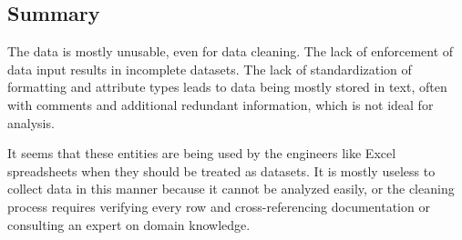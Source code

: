 \subsection{Summary}
The data is mostly unusable, even for data cleaning. The lack of enforcement of data input results in incomplete datasets. The lack of standardization of formatting and attribute types leads to data being mostly stored in text, often with comments and additional redundant information, which is not ideal for analysis.

It seems that these entities are being used by the engineers like Excel spreadsheets when they should be treated as datasets. It is mostly useless to collect data in this manner because it cannot be analyzed easily, or the cleaning process requires verifying every row and cross-referencing documentation or consulting an expert on domain knowledge.
